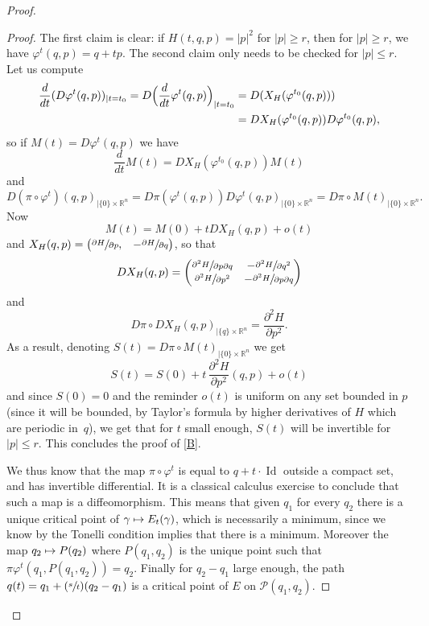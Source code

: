 \documentclass[JEP,XML,SOM,NoFloatCountersInSection,Unicode,published]{cedram}
\newcommand\mto{\mathchoice{\longmapsto}{\mapsto}{\mapsto}{\mapsto}}
\newcommand{\Psfrac}[2]{(\sfrac{#1}{#2})}
\numberwithin{equation}{section}
\DeclareMathOperator{\Id}{Id}
\theoremstyle{plain}
\theoremstyle{definition}
\theoremstyle{remark}
\begin{document}
\begin{proof}
\begin{proof}
The first claim is clear: if $H(t,q,p)= \vert p \vert ^{2}$ for $ \vert p \vert \geq r$, then for $\vert p \vert \geq r$, we have $\varphi^{t}(q,p)=q+tp$.
The second claim only needs to be checked for $ \vert p \vert \leq r$.
Let us compute\vspace*{-3pt}
\begin{align*}
\frac{d}{dt} (D\varphi^{t}(q,p))_{\mid t=t_{0}}=D\Bigl(\frac{d}{dt} \varphi^{t}(q,p)\Bigr)_{\mid t=t_{0}}&=D (X_{H}(\varphi^{t_{0}}(q,p)))\\
&= DX_{H}(\varphi^{t_{0}}(q,p))D\varphi^{t_{0}}(q,p),
\end{align*}
so if $M(t)=D\varphi^{t}(q,p)$ we have\vspace*{-3pt}
\[
\frac{d}{dt}M(t)= DX_{H}(\varphi^{t_{0}}(q,p))M(t)
\]
and\vspace*{-3pt}
\[
D(\pi \circ \varphi^{t})(q,p)_{\mid \{0\}\times {\mathbb R} ^{n}}=D\pi (\varphi^{t}(q,p)) D\varphi^{t}(q,p)_{\mid \{0\}\times {\mathbb R} ^{n}}= D\pi \circ M(t)_{\mid \{0\}\times {\mathbb R} ^{n}}.
\]
Now
\[
M(t)=M(0)+t DX_{H}(q,p)+ o(t)
\]
and $X_{H}(q,p)= \begin{pmatrix} \sfrac{\partial H}{\partial p}, & -\sfrac{\partial H}{\partial q} \end{pmatrix}$, so that
\[
DX_{H}(q,p)= \begin{pmatrix} \sfrac{\partial^{2} H}{\partial p\partial q} &-\sfrac{\partial^{2} H}{\partial q^{2}} \\ \sfrac{\partial^{2} H}{\partial p^{2}} &- \sfrac{\partial^{2} H}{\partial p\partial q} \end{pmatrix}
\]
and
\[
D\pi \circ DX_{H}(q,p)_{\mid \{q\}\times {\mathbb R} ^{n}}=\frac{\partial^{2} H}{\partial p^{2}}.
\]
As a result, denoting $S(t)= D\pi \circ M(t)_{\mid \{0\}\times {\mathbb R} ^{n}}$ we get
\[
S(t)=S(0)+ t\,\frac{\partial^{2} H}{\partial p^{2}} (q,p)+ o(t)
\]
and since $S(0)=0$ and the reminder $o(t)$ is uniform on any set bounded in $p$ (since it will be bounded, by Taylor's formula by higher derivatives of $H$ which are periodic in~$q$), we get that for $t$ small enough, $S(t)$ will be invertible for $ \vert p \vert \leq r$.
This concludes the proof of \eqref{B}.

We thus know that the map $\pi\circ \varphi^{t}$ is equal to $q+ t \cdot \Id$ outside a compact set, and has invertible differential. It is a classical calculus exercise to conclude that such a map is a diffeomorphism. This means that given $q_{1}$ for every $q_{2}$ there is a unique critical point of $\gamma \mto E_{t}(\gamma) $, which is necessarily a minimum, since we know by the Tonelli condition implies that there is a minimum. Moreover the map $q_{2}\mto P(q_{2})$ where $P(q_{1},q_{2})$ is the unique point such that $\pi\varphi^{t} (q_{1},P(q_{1},q_{2}))=q_{2}$. Finally for $q_{2}-q_{1}$ large enough, the path $q(t)=q_{1}+ \Psfrac{s}{t}(q_{2}-q_{1})$ is a critical point of $E$ on ${\mathcal P}(q_{1},q_{2})$.
\end{proof}


\end{proof}
\end{document}
